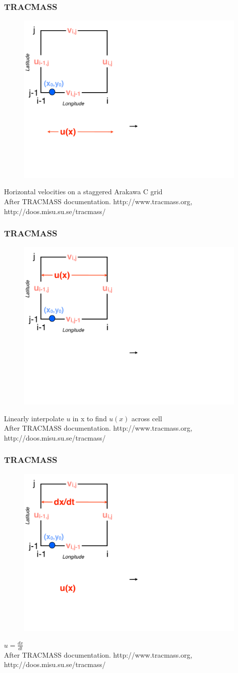 \documentclass[ignorenonframetext]{beamer}
\begin{document}
\begin{frame}[t]\frametitle{TRACMASS}
	\begin{figure}[htbp]
		\centering
		\includegraphics[width=.5\textwidth]{figures/tracmass_box1}
	\end{figure}
	{\Large Horizontal velocities on a staggered Arakawa C grid}
	\tiny{\\After TRACMASS documentation. http://www.tracmass.org, http://doos.misu.su.se/tracmass/}
\end{frame}
\begin{frame}[t,noframenumbering]\frametitle{TRACMASS}
	\begin{figure}[htbp]
		\centering
		\includegraphics[width=.5\textwidth]{figures/tracmass_box2}
	\end{figure}
	{\Large Linearly interpolate $u$ in x to find $u(x)$ across cell}
	\tiny{\\After TRACMASS documentation. http://www.tracmass.org, http://doos.misu.su.se/tracmass/}
\end{frame}
\begin{frame}[t,noframenumbering]\frametitle{TRACMASS}
	\begin{figure}[htbp]
		\centering
		\includegraphics[width=.5\textwidth]{figures/tracmass_box3}
	\end{figure}
	{\Large $u=\frac{dx}{dt}$}
	\tiny{\\After TRACMASS documentation. http://www.tracmass.org, http://doos.misu.su.se/tracmass/}
\end{frame}
\end{document}
